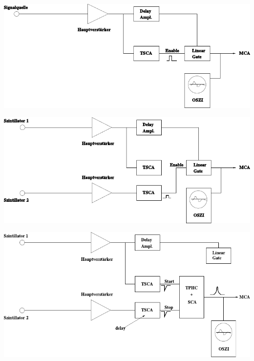 \begin{multicols}{2}
\begin{center}
        \captionsetup{type=figure}
        \begin{adjustbox}{max width=\linewidth, keepaspectratio}
            \includegraphics[]{pdf/Schaltung3}
        \end{adjustbox}
        \label{fig:Schaltung3}
    \end{center}
\endminipage
%
\vspace{10mm}
%
\minipage{\linewidth}
    \begin{center}
        \captionsetup{type=figure}
        \begin{adjustbox}{max width=\linewidth, keepaspectratio}
            \includegraphics[]{pdf/Schaltung4_mod}
        \end{adjustbox}
        \label{fig:Schaltung4}
    \end{center}
\endminipage
%
\vspace{10mm}
%
\minipage{\linewidth}
    \begin{center}
        \captionsetup{type=figure}
        \begin{adjustbox}{max width=\linewidth, keepaspectratio}
            \includegraphics[]{pdf/Schaltung5_mod}

\end{adjustbox}
\end{center}
\end{multicols}
